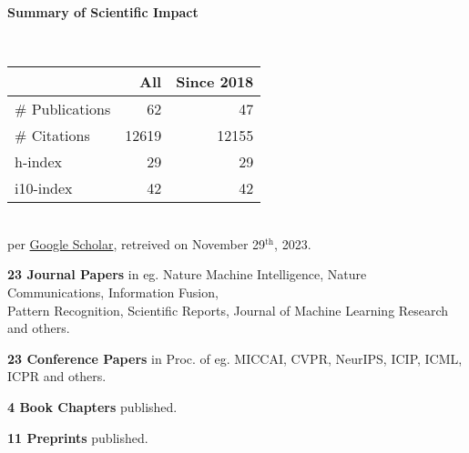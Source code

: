 \headedsection %
{\bf Summary of Scientific Impact}{}{}
{
    \qquad~~~~
    \begin{minipage}[t]{0.6\textwidth}
        \begin{tabular}{lrr}
        \hline
         & All & Since 2018\\
        \hline
        \# Publications & 62     & 47    \\
        \# Citations    & 12619  & 12155 \\
        h-index         & 29     & 29    \\
        i10-index       & 42     & 42    \\
        \hline
    \end{tabular}
    \\
    {\footnotesize{
        per \href{https://scholar.google.com/citations?user=wpLQuroAAAAJ}{Google Scholar},
        retreived on November 29$^\text{th}$, 2023.
        }
    }
    \end{minipage}

    \ifdefined\shortcv
        \vstep
        {\bf 23 Journal Papers} in eg. Nature Machine Intelligence, Nature Communications, Information Fusion,\\
        \hspace*{\fill} Pattern Recognition, Scientific Reports, Journal of Machine Learning Research and others.

        {\bf 23 Conference Papers} in Proc. of eg. MICCAI, CVPR, NeurIPS, ICIP, ICML, ICPR and others.

        {\bf 4 Book Chapters} published.

        {\bf 11 Preprints} published.
        
    \else
        {}
    \fi

}
